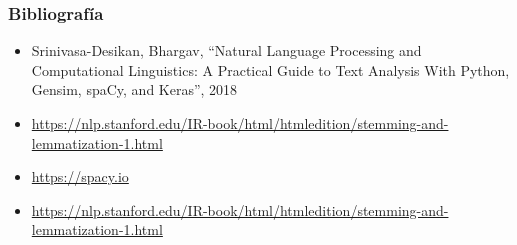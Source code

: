 \documentclass[
10pt, %
aspectratio=169, %
]{beamer}
\begin{document}
	
	\begin{frame}
		
		\frametitle{Bibliografía}
		
		\begin{itemize}
			
			\item Srinivasa-Desikan, Bhargav, ``Natural Language Processing and Computational Linguistics: A Practical Guide to Text Analysis With Python, Gensim, spaCy, and Keras'', 2018			
			
			\item \url{https://nlp.stanford.edu/IR-book/html/htmledition/stemming-and-lemmatization-1.html}
			
			\item \url{https://spacy.io}
			
			\item \url{https://nlp.stanford.edu/IR-book/html/htmledition/stemming-and-lemmatization-1.html}
			
		\end{itemize}
		
	\end{frame}
	
	
	\begin{frame}
		\titlepage
	\end{frame}
	
	
	
\end{document}
